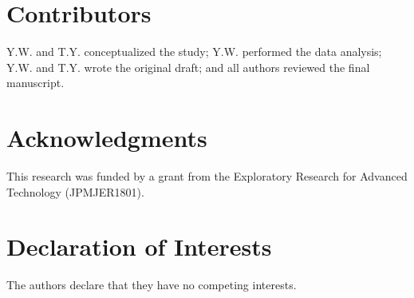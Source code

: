 \documentclass[final,3p,times,twocolumn]{elsarticle}
\begin{document}
\label{sec:discussion}






% 

% 





\section*{Contributors}
Y.W. and T.Y. conceptualized the study; Y.W. performed the data analysis; Y.W. and T.Y. wrote the original draft; and all authors reviewed the final manuscript.
\label{contributors}

\section*{Acknowledgments}
This research was funded by a grant from the Exploratory Research for Advanced Technology (JPMJER1801).
\label{acknowledgments}

\section*{Declaration of Interests}
The authors declare that they have no competing interests.
\label{declaration of interests}

\end{document}
